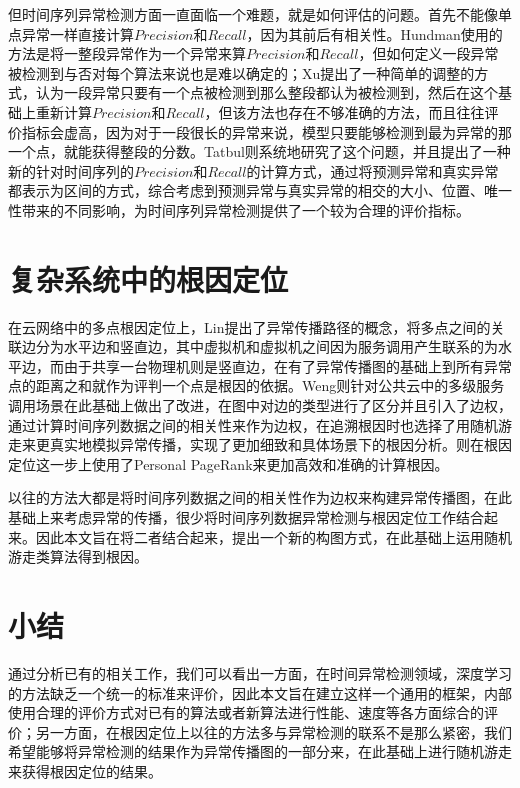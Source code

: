但时间序列异常检测方面一直面临一个难题，就是如何评估的问题。首先不能像单点异常一样直接计算$Precision$和$Recall$，因为其前后有相关性。Hundman\cite{DBLP:conf/kdd/HundmanCLCS18}使用的方法是将一整段异常作为一个异常来算$Precision$和$Recall$，但如何定义一段异常被检测到与否对每个算法来说也是难以确定的；Xu\cite{xu2018unsupervised}提出了一种简单的调整的方式，认为一段异常只要有一个点被检测到那么整段都认为被检测到，然后在这个基础上重新计算$Precision$和$Recall$，但该方法也存在不够准确的方法，而且往往评价指标会虚高，因为对于一段很长的异常来说，模型只要能够检测到最为异常的那一个点，就能获得整段的分数。Tatbul\cite{tatbul2018precision}则系统地研究了这个问题，并且提出了一种新的针对时间序列的$Precision$和$Recall$的计算方式，通过将预测异常和真实异常都表示为区间的方式，综合考虑到预测异常与真实异常的相交的大小、位置、唯一性带来的不同影响，为时间序列异常检测提供了一个较为合理的评价指标。

\section{复杂系统中的根因定位}

在云网络中的多点根因定位上，Lin\cite{lin2016automated}提出了异常传播路径的概念，将多点之间的关联边分为水平边和竖直边，其中虚拟机和虚拟机之间因为服务调用产生联系的为水平边，而由于共享一台物理机则是竖直边，在有了异常传播图的基础上到所有异常点的距离之和就作为评判一个点是根因的依据。Weng\cite{weng2018root}则针对公共云中的多级服务调用场景在此基础上做出了改进，在图中对边的类型进行了区分并且引入了边权，通过计算时间序列数据之间的相关性来作为边权，在追溯根因时也选择了用随机游走来更真实地模拟异常传播，实现了更加细致和具体场景下的根因分析。\cite{wu2020microrca}则在根因定位这一步上使用了Personal PageRank来更加高效和准确的计算根因。

以往的方法大都是将时间序列数据之间的相关性作为边权来构建异常传播图，在此基础上来考虑异常的传播，很少将时间序列数据异常检测与根因定位工作结合起来。因此本文旨在将二者结合起来，提出一个新的构图方式，在此基础上运用随机游走类算法得到根因。

\section{小结}
通过分析已有的相关工作，我们可以看出一方面，在时间异常检测领域，深度学习的方法缺乏一个统一的标准来评价，因此本文旨在建立这样一个通用的框架，内部使用合理的评价方式对已有的算法或者新算法进行性能、速度等各方面综合的评价；另一方面，在根因定位上以往的方法多与异常检测的联系不是那么紧密，我们希望能够将异常检测的结果作为异常传播图的一部分来，在此基础上进行随机游走来获得根因定位的结果。

